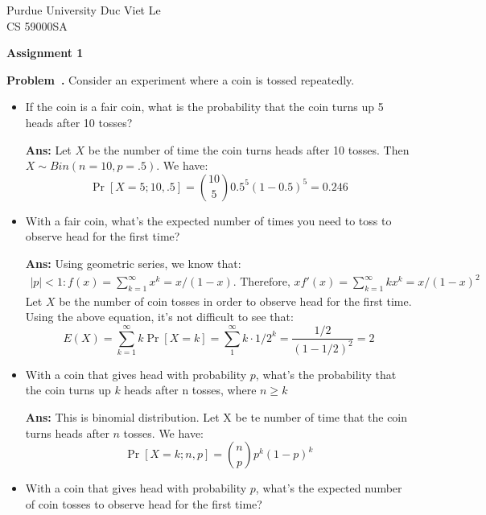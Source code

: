 \documentclass{article}
\newcommand{\dspace}{\baselineskip 16pt}
\newcommand{\sspace}{\baselineskip 14pt}
\newcounter{problem}[section]
\newenvironment{problem}[1][]{\refstepcounter{problem}\par\medskip
   \noindent \textbf{Problem~\theproblem. #1} \rmfamily}{\medskip}
\newenvironment{proof}{\begin{mdframed}\textbf{Ans:}}{ \end{mdframed}}
\begin{document}
\sspace
\noindent
Purdue University \hfill Duc Viet Le\\
CS 59000SA        \hfill 
\dspace
\begin{center}
{\bf Assignment 1}
\end{center}
\vspace{.2in}
\begin{problem}
	Consider an experiment where a coin is tossed repeatedly.
	\begin{itemize}
		\item If the coin is a fair coin, what is the probability that the coin turns up 5 heads after 10 tosses?
		\begin{proof}
			Let $X$ be the number of time the coin turns heads after 10 tosses. Then $X \sim Bin(n = 10, p = .5)$. We have: 
			\begin{equation*}
				\Pr[X=5; 10, .5] = \binom{10}{5}0.5^{5}(1-0.5)^5=0.246 	
			\end{equation*}
		\end{proof}
		\item With a fair coin, what’s the expected number of times you need to toss to observe head for the first time?
		\begin{proof}
			Using geometric series, we know that: 
			\begin{equation*}
				\begin{split}
					|p| < 1: f(x) = \sum_{k=1}^{\infty}x^k = x/(1-x) \text{. Therefore, } xf'(x) = \sum_{k=1}^{\infty}kx^k = x/(1-x)^2
				\end{split}
			\end{equation*}
			Let $X$ be the number of coin tosses in order to observe head for the first time. Using the above equation, it's not difficult to see that: 
			$$
				E(X) = \sum_{k=1}^{\infty}k\Pr[X=k] = \sum_{1}^{\infty}k\cdot 1/2^k = \frac{1/2}{(1-1/2)^2} = 2
			$$
		\end{proof}
		\item With a coin that gives head with probability $p$, what’s the probability that the coin turns up $k$ heads after n tosses, where $n \geq k$
		\begin{proof}
			This is binomial distribution. Let X be te number of time that the coin turns heads after $n$ tosses. We have:
			\begin{equation*}
				\Pr[X=k;n,p] = \binom{n}{p}p^k(1-p)^k
			\end{equation*}
		\end{proof}
		\item With a coin that gives head with probability $p$, what’s the expected number of coin tosses to observe head for the first time?

\end{itemize}
\end{problem}
\end{document}
